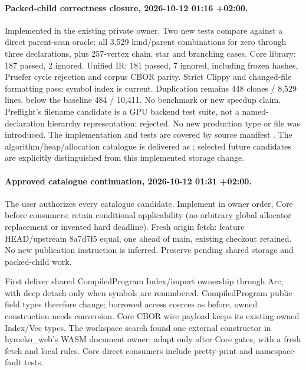 \documentclass[11pt,a4paper]{article}
\begin{document}
\paragraph{Packed-child correctness closure, 2026-10-12 01:16 +02:00.}
Implemented in the existing private owner. Two new tests compare against a direct
parent-scan oracle: all 3,529 kind/parent combinations for zero through three
declarations, plus 257-vertex chain, star and branching cases. Core library:
187 passed, 2 ignored. Unified IR: 181 passed, 7 ignored, including frozen hashes,
Pruefer cycle rejection and corpus CBOR parity. Strict Clippy and changed-file
formatting pass; symbol index is current. Duplication remains 448 clones / 8,529
lines, below the baseline 484 / 10,411. No benchmark or new speedup claim.
Preflight's filename candidate  is a GPU
backend test suite, not a named-declaration hierarchy representation; rejected.
No new production type or file was introduced. The implementation and tests are
covered by source manifest
.
The algorithm/heap/allocation catalogue is delivered as
; selected future candidates are
explicitly distinguished from this implemented storage change.

\paragraph{Approved catalogue continuation, 2026-10-12 01:31 +02:00.}
The user authorizes every catalogue candidate. Implement in owner order, Core
before consumers; retain conditional applicability (no arbitrary global allocator
replacement or invented hard deadline). Fresh origin fetch: feature HEAD/upstream
8a7d7f5 equal, one ahead of main, existing checkout retained. No new publication
instruction is inferred. Preserve pending shared storage and packed-child work.

First deliver shared CompiledProgram Index/import ownership through Arc, with
deep detach only when symbols are renumbered. CompiledProgram public field types
therefore change; borrowed access coerces as before, owned construction needs
conversion. Core CBOR wire payload keeps its existing owned Index/Vec types.
The workspace search found one external constructor in hymeko\_web's WASM
document owner; adapt only after Core gates, with a fresh fetch and local rules.
Core direct consumers include pretty-print and namespace-fault tests.
\end{document}
